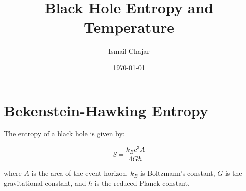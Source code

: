 \documentclass{article}
\begin{document}
    \title{Black Hole Entropy and Temperature}
    \author{Ismail Chajar}
    \date{\today}
    \maketitle

    \section{Bekenstein-Hawking Entropy}
    The entropy of a black hole is given by:

    \begin{equation}
        S = \frac{k_B c^3 A}{4 G \hbar}
    \end{equation}

    where \( A \) is the area of the event horizon, \( k_B \) is Boltzmann's constant, \( G \) is the gravitational constant, and \( \hbar \) is the reduced Planck constant.

    
\end{document}
